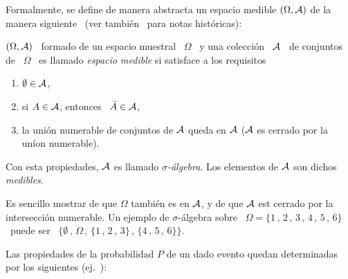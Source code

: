 Formalmente, se define  de manera abstracta un espacio  medible $(\Omega,\mathcal{A})$ de
la  manera  siguiente~\cite{Hal50,  Fel68,  Fel71,  Bre88,  IbaPar97,  AthLah06,
  Bog07:v1, Coh13} (ver  tambi\'en~\cite[\& Ref.]{BarNov78, Bor98, Sie18, Sie75,
  Sie76} para notas hist\'oricas):
%
\begin{definicion}
  $(\Omega, \mathcal{A})$ \ formado de un espacio muestral \ $\Omega$ \ y una colecci\'on
  \ $\mathcal{A}$  \ de conjuntos  de \  $\Omega$ \ es  llamado {\it espacio  medible} si
  satisface a los requisitos
  \begin{enumerate}%
  \item $\emptyset \in \mathcal{A}$,
  \item si $A \in \mathcal{A}$, entonces \ $\bar{A} \in \mathcal{A}$,
  \item la uni\'on numerable de conjuntos de $\mathcal{A}$ queda en $\mathcal{A}$ ($\mathcal{A}$ es cerrado
    por la un\'ion numerable).
  \end{enumerate}
  Con esta propiedades, $\mathcal{A}$  es llamado {\it $\sigma$-\'algebra}. Los elementos
  de $\mathcal{A}$ son dichos {\it medibles}.
\end{definicion}
%
\noindent Es  sencillo mostrar de  que $\Omega$ tambi\'en  es en $\mathcal{A}$, y  de que
$\mathcal{A}$   est   cerrado  por   la   intersecci\'on   numerable.    Un  ejemplo   de
$\sigma$-\'algebra sobre \ $\Omega = \{ 1 \, , \,  2 \, , \, 3 \, , \, 4 \, , \,
5 \, , \, 6 \}$ \ puede ser \ $\big\{ \emptyset \, , \, \Omega \, , \, \{ 1 \, ,
\, 2 \, , \, 3 \} \, , \, \{ 4 \, , \, 5 \, , \, 6 \} \big\}$.

Las propiedades de la probabilidad $P$ de un dado evento quedan determinadas por
los siguientes (ej.~\cite{Spi76, Kol56, ShaVov06, Pla05}):

